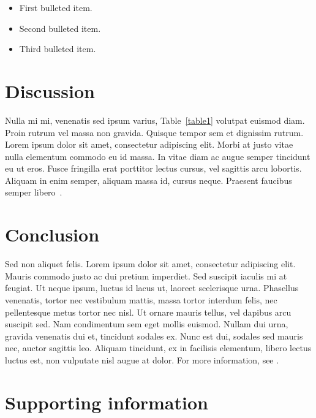 \documentclass[10pt,letterpaper]{article}
\begin{document}
\begin{itemize}
	\item First bulleted item.
	\item Second bulleted item.
	\item Third bulleted item.
\end{itemize}

\section*{Discussion}
Nulla mi mi, venenatis sed ipsum varius, Table~\ref{table1} volutpat euismod diam. Proin rutrum vel massa non gravida. Quisque tempor sem et dignissim rutrum. Lorem ipsum dolor sit amet, consectetur adipiscing elit. Morbi at justo vitae nulla elementum commodo eu id massa. In vitae diam ac augue semper tincidunt eu ut eros. Fusce fringilla erat porttitor lectus cursus, vel sagittis arcu lobortis. Aliquam in enim semper, aliquam massa id, cursus neque. Praesent faucibus semper libero~\cite{bib3}.

\section*{Conclusion}


Sed non aliquet felis. Lorem ipsum dolor sit amet, consectetur adipiscing elit. Mauris commodo justo ac dui pretium imperdiet. Sed suscipit iaculis mi at feugiat. Ut neque ipsum, luctus id lacus ut, laoreet scelerisque urna. Phasellus venenatis, tortor nec vestibulum mattis, massa tortor interdum felis, nec pellentesque metus tortor nec nisl. Ut ornare mauris tellus, vel dapibus arcu suscipit sed. Nam condimentum sem eget mollis euismod. Nullam dui urna, gravida venenatis dui et, tincidunt sodales ex. Nunc est dui, sodales sed mauris nec, auctor sagittis leo. Aliquam tincidunt, ex in facilisis elementum, libero lectus luctus est, non vulputate nisl augue at dolor. For more information, see .

\section*{Supporting information}
\end{document}
